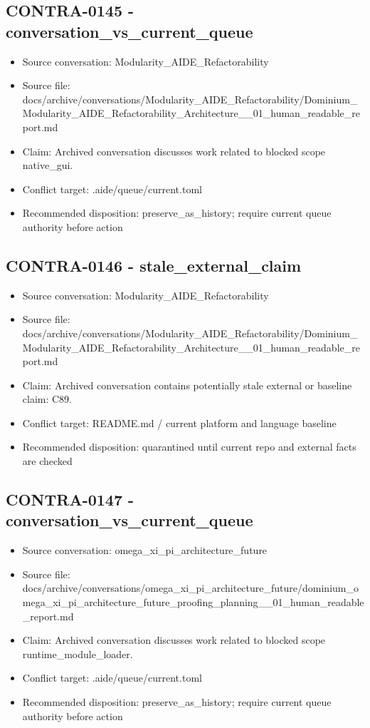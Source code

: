 \documentclass[11pt,a4paper]{report}
\begin{document}
\subsection{CONTRA-0145 - conversation\_vs\_current\_queue}

\begin{itemize}
\item Source conversation: Modularity\_AIDE\_Refactorability
\item Source file: docs/archive/conversations/Modularity\_AIDE\_Refactorability/Dominium\_Modularity\_AIDE\_Refactorability\_Architecture\_\_01\_human\_readable\_report.md
\item Claim: Archived conversation discusses work related to blocked scope native\_gui.
\item Conflict target: .aide/queue/current.toml
\item Recommended disposition: preserve\_as\_history; require current queue authority before action
\end{itemize}

\subsection{CONTRA-0146 - stale\_external\_claim}

\begin{itemize}
\item Source conversation: Modularity\_AIDE\_Refactorability
\item Source file: docs/archive/conversations/Modularity\_AIDE\_Refactorability/Dominium\_Modularity\_AIDE\_Refactorability\_Architecture\_\_01\_human\_readable\_report.md
\item Claim: Archived conversation contains potentially stale external or baseline claim: C89.
\item Conflict target: README.md / current platform and language baseline
\item Recommended disposition: quarantined until current repo and external facts are checked
\end{itemize}

\subsection{CONTRA-0147 - conversation\_vs\_current\_queue}

\begin{itemize}
\item Source conversation: omega\_xi\_pi\_architecture\_future
\item Source file: docs/archive/conversations/omega\_xi\_pi\_architecture\_future/dominium\_omega\_xi\_pi\_architecture\_future\_proofing\_planning\_\_01\_human\_readable\_report.md
\item Claim: Archived conversation discusses work related to blocked scope runtime\_module\_loader.
\item Conflict target: .aide/queue/current.toml
\item Recommended disposition: preserve\_as\_history; require current queue authority before action
\end{itemize}
\end{document}
